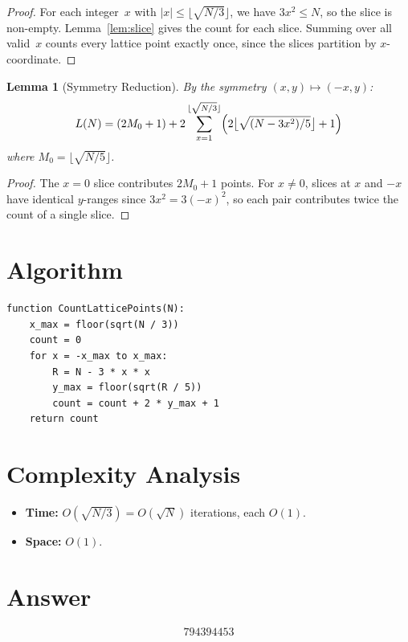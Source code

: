 \documentclass[11pt]{article}
\newtheorem{lemma}[theorem]{Lemma}
\begin{document}
\begin{proof}
For each integer~$x$ with $|x| \le \lfloor\sqrt{N/3}\rfloor$, we have $3x^2 \le N$, so the slice is non-empty. Lemma~\ref{lem:slice} gives the count for each slice. Summing over all valid~$x$ counts every lattice point exactly once, since the slices partition by $x$-coordinate.
\end{proof}

\begin{lemma}[Symmetry Reduction]
By the symmetry $(x,y) \mapsto (-x,y)$:
\[
L(N) = (2M_0+1) + 2\sum_{x=1}^{\lfloor\sqrt{N/3}\rfloor}\Bigl(2\bigl\lfloor\sqrt{(N-3x^2)/5}\bigr\rfloor + 1\Bigr)
\]
where $M_0 = \lfloor\sqrt{N/5}\rfloor$.
\end{lemma}

\begin{proof}
The $x=0$ slice contributes $2M_0+1$ points. For $x \ne 0$, slices at $x$ and $-x$ have identical $y$-ranges since $3x^2 = 3(-x)^2$, so each pair contributes twice the count of a single slice.
\end{proof}

\section{Algorithm}

\begin{verbatim}
function CountLatticePoints(N):
    x_max = floor(sqrt(N / 3))
    count = 0
    for x = -x_max to x_max:
        R = N - 3 * x * x
        y_max = floor(sqrt(R / 5))
        count = count + 2 * y_max + 1
    return count
\end{verbatim}

\section{Complexity Analysis}

\begin{itemize}
\item \textbf{Time:} $O(\sqrt{N/3}) = O(\sqrt{N})$ iterations, each $O(1)$.
\item \textbf{Space:} $O(1)$.
\end{itemize}

\section{Answer}

\[
\boxed{794394453}
\]
\end{document}
